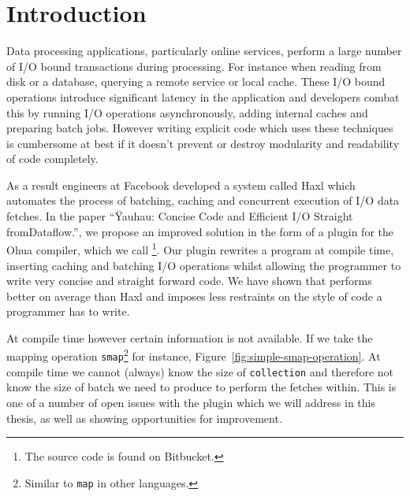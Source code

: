 \chapter{Introduction}

\label{ch:Intro}



Data processing applications, particularly online services, perform a large number of I/O bound transactions during processing.
For instance when reading from disk or a database, querying a remote service or local cache.
These I/O bound operations introduce significant latency in the application and developers combat this by running I/O operations asynchronously, adding internal caches and preparing batch jobs.
However writing explicit code which uses these techniques is cumbersome at best if it doesn't prevent or destroy modularity and readability of code completely.

As a result engineers at Facebook developed a system called Haxl\cite{Marlow:2014:NFA:2692915.2628144} which automates the process of batching, caching and concurrent execution of I/O data fetches.
In the paper ``Ÿauhau: Concise Code and Efficient I/O Straight from\-Dataflow.''\cite{ErtelGoensAdamEtAl2016}, we propose an improved solution in the form of a plugin for the Ohua\cite{Ertel:2015:OID:2807426.2807431}\cite{Ohua:library:link} compiler, which we call \yauhau{}\footnote{The source code is found on Bitbucket\cite{Yauhau:repository:link}.}.
Our plugin rewrites a program at compile time, inserting caching and batching I/O operations whilst allowing the programmer to write very concise and straight forward code.
We have shown that \yauhau{} performs better on average than Haxl and imposes less restraints on the style of code a programmer has to write.

At compile time however certain information is not available.
If we take the mapping operation \texttt{smap}\footnote{Similar to \texttt{map} in other languages.} for instance, Figure~\ref{fig:simple-smap-operation}.
At compile time we cannot (always) know the size of \texttt{collection} and therefore not know the size of batch we need to produce to perform the fetches within.
This is one of a number of open issues with the \yauhau{} plugin which we will address in this thesis, as well as showing opportunities for improvement.

